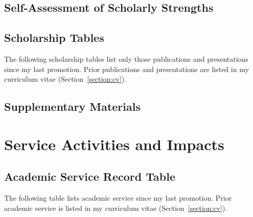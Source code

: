 \documentclass[11pt,openany,oneside]{book}
\begin{document}
\chapter{Self-Assessment of Scholarly Strengths}


\chapter{Scholarship Tables}  %
The following scholarship tables list only those publications and presentations since my last promotion.
Prior publications and presentations are listed in my curriculum vitae (Section~\ref{section:cv}).



\chapter{Supplementary Materials}  %

\begin{supplements}[
    directory=supplements/scholarship/,
    structure=enumerate,
    type=publications,
]
\end{supplements}


\part{Service Activities and Impacts}\label{part:service}  %

\chapter{Academic Service Record Table}  %
The following table lists academic service since my last promotion.
Prior academic service is listed in my curriculum vitae (Section~\ref{section:cv}).
\end{document}
